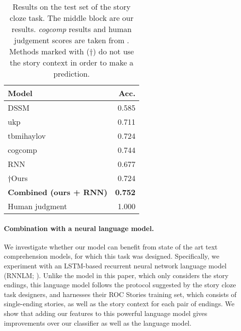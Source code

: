 \documentclass[11pt,a4paper]{article}
\newcommand{\com}[1]{}
\newcommand{\resolved}[1]{}
\newcommand{\yc}[1]{{\color{bblue}\{\textit{#1}\}$_{yc}$}}
\newcommand{\nascomment}[1]{{\color{blue}\textsc{[#1 --nas]}}}
\renewcommand{\nascomment}[1]{}
\renewcommand{\yc}[1]{}
\begin{document}
\begin{table}[!t]
\begin{center}
\begin{tabular}{|l|r|} \hline
{\bf Model} & {\bf Acc.} \\ \hline
{DSSM} \cite{Mostafazadeh:2016} & 0.585 \\ 
{ukp} \cite{Mihaylov:2017} & 0.711\\ 
{tbmihaylov} \cite{Mihaylov:2017} & 0.724\\ 
{cogcomp}  & 0.744 \\ \hline\hline
{RNN}		& 0.677 \\ 
$\dagger${Ours} & {0.724} \\ 
{\bf Combined (ours + RNN)} & {\bf 0.752} \\ \hline\hline
Human judgment & 1.000 \\ \hline
\end{tabular}
\end{center}
\caption{\label{cloze_results}\resolved{\yc{we should change accuracy to be in 0-100\% scale to be consistent with Table 2}}Results on the test set of the  story cloze task.\com{
The upper block shows published results, }
The middle block are our results.
{\it cogcomp} results and human judgement scores are taken from \cite{Mostafazadeh:2017}.
Methods marked with ($\dagger$) do not use the story context in order to make a prediction. 
 \resolved{\nascomment{I added 0s to ``Niko'' result
  and ``human''
  so sig. digits would line up.  if we don't have sig digits for some
  of them, make the zeros white so the numbers line up.  where did the
human judgments come from?  those are not mentioned in our text anywhere!}
}}
\end{table}


\paragraph{Combination with a neural language model.}
We investigate whether our model can benefit from state of the art text comprehension models, for which this task was designed. 
Specifically, we experiment with an LSTM-based \cite{hochreiter1997long} recurrent neural network language model (RNNLM; \citealp{mikolov2010recurrent}). %
Unlike the model in this paper, which only considers the story endings, this language model follows the protocol suggested by the story cloze task designers, and harnesses their ROC Stories training set, which consists of single-ending stories, 
as well as the story context for each pair of endings. 
We show that adding our features to this powerful language model
gives improvements over our classifier as well as the language
model.  \resolved{\nascomment{reworded.  more important that our features help
  the language model, than the other way around!}}
\end{document}

